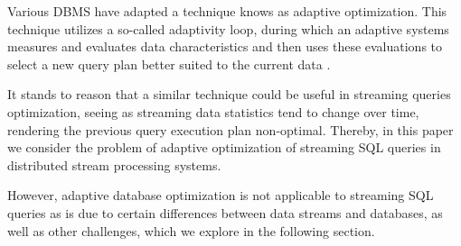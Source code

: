 Various DBMS have adapted a technique knows as adaptive optimization. This technique utilizes a so-called adaptivity loop, during which an adaptive systems measures and evaluates data characteristics and then uses these evaluations to select a new query plan better suited to the current data \cite{deshpande2007adaptive}. 

It stands to reason that a similar technique could be useful in streaming queries optimization, seeing as streaming data statistics tend to change over time, rendering the previous query execution plan non-optimal. Thereby, in this paper we consider the problem of adaptive optimization of streaming SQL queries in distributed stream processing systems. 

However, adaptive database optimization is not applicable to streaming SQL queries as is due to certain differences between data streams and databases, as well as other challenges, which we explore in the following section.

